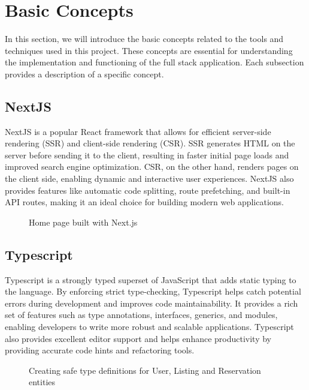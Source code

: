 \chapter{Basic Concepts}

In this section, we will introduce the basic concepts related to the tools and techniques used in this project. These concepts are essential for understanding the implementation and functioning of the full stack application. Each subsection provides a description of a specific concept.

\section{NextJS}
NextJS is a popular React framework that allows for efficient server-side rendering (SSR) and client-side rendering (CSR). SSR generates HTML on the server before sending it to the client, resulting in faster initial page loads and improved search engine optimization. CSR, on the other hand, renders pages on the client side, enabling dynamic and interactive user experiences. NextJS also provides features like automatic code splitting, route prefetching, and built-in API routes, making it an ideal choice for building modern web applications.

\begin{figure}[!ht]
    
    \caption{Home page built with Next.js}\label{fig:nextjs}
\end{figure}

\section{Typescript}
Typescript is a strongly typed superset of JavaScript that adds static typing to the language. By enforcing strict type-checking, Typescript helps catch potential errors during development and improves code maintainability. It provides a rich set of features such as type annotations, interfaces, generics, and modules, enabling developers to write more robust and scalable applications. Typescript also provides excellent editor support and helps enhance productivity by providing accurate code hints and refactoring tools.

\begin{figure}[!ht]
    
    \caption{Creating safe type definitions for User, Listing and Reservation entities}\label{fig:typescript}
\end{figure}

